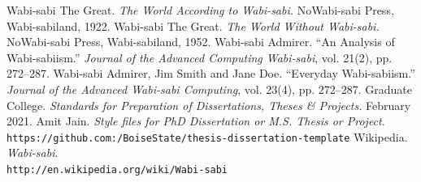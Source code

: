 \documentclass[dissertation]{bsu-cs}  %
\begin{document}
%
%





%
%



\begin{thebibliography}{99} 
\label{references}
 Wabi-sabi The Great. \emph{The World According to Wabi-sabi.} NoWabi-sabi
Press, Wabi-sabiland, 1922.
 Wabi-sabi The Great. \emph{The World Without Wabi-sabi.} NoWabi-sabi
Press, Wabi-sabiland, 1952.
 Wabi-sabi Admirer. ``An Analysis of Wabi-sabiism.'' \emph{Journal of the
Advanced Computing Wabi-sabi}, vol. 21(2), pp. 272--287.
 Wabi-sabi Admirer, Jim Smith and Jane Doe. ``Everyday
Wabi-sabiism.'' \emph{Journal of the Advanced Wabi-sabi Computing}, vol. 23(4), pp. 272--287.
 Graduate College. \emph{Standards for Preparation of Dissertations, Theses \&
Projects.} February 2021.
 Amit Jain. \emph{Style files for PhD Dissertation or M.S. Thesis or Project}.\\
\texttt{https://github.com:/BoiseState/thesis-dissertation-template}
 Wikipedia. \emph{Wabi-sabi}.\\
\texttt{http://en.wikipedia.org/wiki/Wabi-sabi}
\end{thebibliography}


%
%
\end{document}
